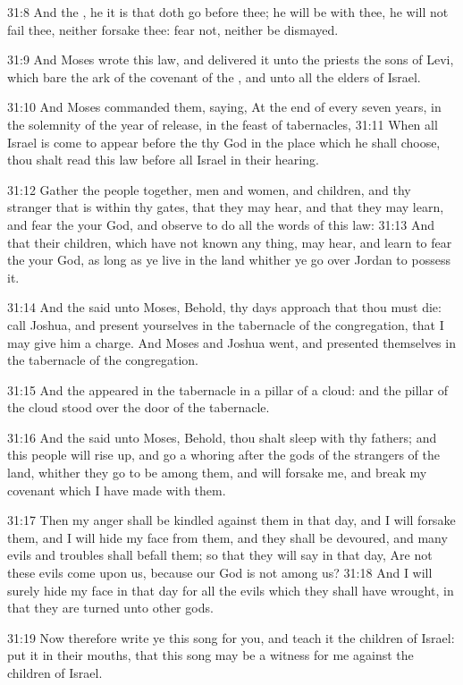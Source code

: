 31:8 And the \LORD, he it is that doth go before thee; he will be with
thee, he will not fail thee, neither forsake thee: fear not, neither
be dismayed.

31:9 And Moses wrote this law, and delivered it unto the priests the
sons of Levi, which bare the ark of the covenant of the \LORD, and unto
all the elders of Israel.

31:10 And Moses commanded them, saying, At the end of every seven
years, in the solemnity of the year of release, in the feast of
tabernacles, 31:11 When all Israel is come to appear before the \LORD
thy God in the place which he shall choose, thou shalt read this law
before all Israel in their hearing.

31:12 Gather the people together, men and women, and children, and thy
stranger that is within thy gates, that they may hear, and that they
may learn, and fear the \LORD your God, and observe to do all the words
of this law: 31:13 And that their children, which have not known any
thing, may hear, and learn to fear the \LORD your God, as long as ye
live in the land whither ye go over Jordan to possess it.

31:14 And the \LORD said unto Moses, Behold, thy days approach that
thou must die: call Joshua, and present yourselves in the tabernacle
of the congregation, that I may give him a charge. And Moses and
Joshua went, and presented themselves in the tabernacle of the
congregation.

31:15 And the \LORD appeared in the tabernacle in a pillar of a cloud:
and the pillar of the cloud stood over the door of the tabernacle.

31:16 And the \LORD said unto Moses, Behold, thou shalt sleep with thy
fathers; and this people will rise up, and go a whoring after the gods
of the strangers of the land, whither they go to be among them, and
will forsake me, and break my covenant which I have made with them.

31:17 Then my anger shall be kindled against them in that day, and I
will forsake them, and I will hide my face from them, and they shall
be devoured, and many evils and troubles shall befall them; so that
they will say in that day, Are not these evils come upon us, because
our God is not among us?  31:18 And I will surely hide my face in that
day for all the evils which they shall have wrought, in that they are
turned unto other gods.

31:19 Now therefore write ye this song for you, and teach it the
children of Israel: put it in their mouths, that this song may be a
witness for me against the children of Israel.

